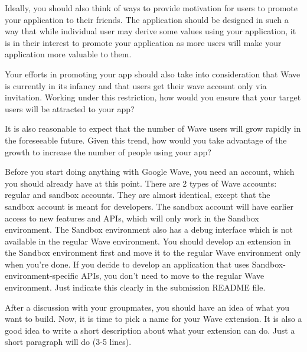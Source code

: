Ideally, you should also think of ways to provide motivation for users
to promote your application to their friends. The application should
be designed in such a way that while individual user may derive some
values using your application, it is in their interest to promote your
application as more users will make your application more valuable to
them.

Your efforts in promoting your app should also take into consideration
that Wave is currently in its infancy and that users get their wave account
only via invitation. Working under this restriction, how would you
ensure that your target users will be attracted to your app?

It is also reasonable to expect that the number of Wave users will
grow rapidly in the foreseeable future. Given this trend, how would
you take advantage of the growth to increase the number of people
using your app?


Before you start doing anything with Google Wave, you need an account,
which you should already have at this point.  There are 2 types of
Wave accounts: regular and sandbox accounts. They are almost
identical, except that the sandbox account is meant for
developers. The sandbox account will have earlier access to new
features and APIs, which will only work in the Sandbox environment.  The
Sandbox environment also has a debug interface which is not available
in the regular Wave environment. You should develop an extension in
the Sandbox environment first and move it to the regular Wave
environment only when you're done. If you decide to develop an
application that uses Sandbox-environment-specific APIs, you don't
need to move to the regular Wave environment. Just indicate this
clearly in the submission README file.

% 



After a discussion with your groupmates, you should have an idea of
what you want to build. Now, it is time to pick a name for your Wave
extension. It is also a good idea to write a short description about
what your extension can do. Just a short paragraph will do (3-5
lines).

